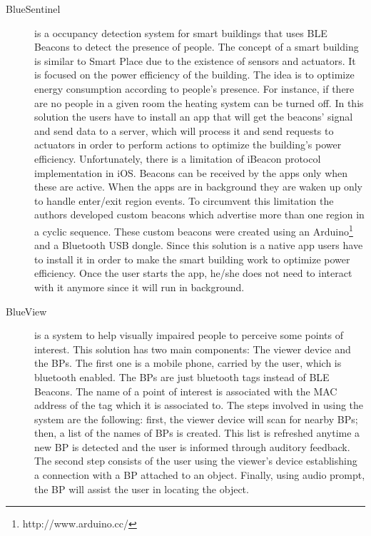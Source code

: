 \begin{description}
  \item[BlueSentinel\cite{Conte2014}]
  is a
  occupancy detection system for smart buildings
  that uses \gls{BLE} Beacons to detect the presence of
  people. The concept of a smart building
  is similar to Smart Place
  due to the existence of sensors and actuators.
  It is focused on the power efficiency of the
  building.
  The idea is to optimize energy
  consumption according to people's presence.
  For instance, if there are no people in a given room
  the heating system can be turned off.
  In this solution the users have to install
  an app that will get the beacons' signal and
  send data to a server, which will process it
  and send requests to actuators in order to
  perform actions to optimize the
  building's power efficiency.
  Unfortunately, there is a limitation
  of iBeacon protocol implementation
  in iOS.
  Beacons can be received by the apps
  only when these are active. When the apps are in
  background they are waken up only to handle
  enter/exit region events. To circumvent this
  limitation the authors developed custom
  beacons which advertise more than one region
  in a cyclic sequence. These custom beacons
  were created using an
  Arduino\footnote{http://www.arduino.cc/}
  and a Bluetooth \gls{USB} dongle.
  Since this solution is a native app
  users have to install it in order
  to make the smart building work to
  optimize power efficiency.
  Once the user starts the app, he/she does not
  need to interact with it anymore since it
  will run in background.
  \item[BlueView\cite{Chen2013}]
  is a system to help
  visually impaired people to perceive some points of interest.
  This solution has two main components: The viewer device
  and the \glspl{BP}. The first one is a mobile phone,
  carried by the user, which is bluetooth enabled.
  The \glspl{BP} are just bluetooth tags instead of
  \gls{BLE} Beacons. The name of a point of interest is associated with the
  \gls{MAC} address of the tag which it is associated to.
  The steps involved in using the system are the
  following: first, the viewer device will scan
  for nearby \glspl{BP}; then, a list of the names of
  \glspl{BP} is created. This list is refreshed anytime a new
  \gls{BP} is detected and the user is informed through auditory feedback.
  The second step consists of the user using
  the viewer's device establishing a connection with a \gls{BP}
  attached to an object. Finally, using audio prompt, the \gls{BP}
  will assist the user in locating the object.

\end{description}
